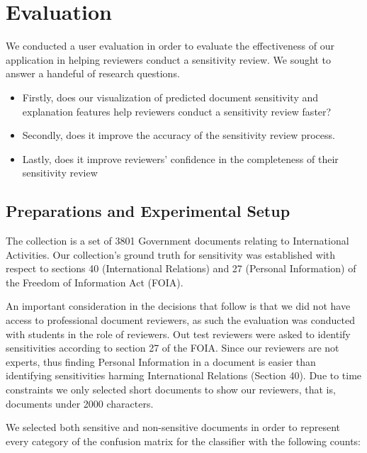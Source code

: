 \documentclass{l4proj}
\begin{document}
\chapter{Evaluation}

We conducted a user evaluation in order to evaluate the effectiveness of our application in helping reviewers conduct a sensitivity review. We sought to answer a handeful of research questions.

\begin{itemize}
    \item Firstly, does our visualization of predicted document sensitivity and explanation features help reviewers conduct a sensitivity review faster?
    \item Secondly, does it improve the accuracy of the sensitivity review process.
    \item Lastly, does it improve reviewers' confidence in the completeness of their sensitivity review
\end{itemize}

\section{Preparations and Experimental Setup}

The collection is a set of 3801 Government documents relating to International Activities.
Our collection's ground truth for sensitivity was established with respect to sections 40 (International Relations) and 27 (Personal Information) of the Freedom of Information Act (FOIA).

An important consideration in the decisions that follow is that we did not have access to professional document reviewers, as such the evaluation was conducted with students in the role of reviewers. 
Out test reviewers were asked to identify sensitivities according to section 27 of the FOIA. Since our reviewers are not experts, thus finding Personal Information in a document is easier than identifying sensitivities harming International Relations (Section 40).
Due to time constraints we only selected short documents to show our reviewers, that is, documents under 2000 characters. 

We selected both sensitive and non-sensitive documents in order to represent every category of the confusion matrix for the classifier with the following counts:
\end{document}
